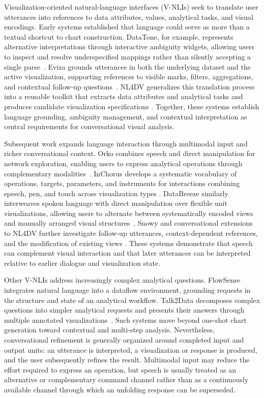 \documentclass[journal]{IEEEtran}
\begin{document}
Visualization-oriented natural-language interfaces (V-NLIs) seek to translate
user utterances into references to data attributes, values, analytical tasks,
and visual encodings. Early systems established that language could serve as
more than a textual shortcut to chart construction. DataTone, for example,
represents alternative interpretations through interactive ambiguity widgets,
allowing users to inspect and resolve underspecified mappings rather than
silently accepting a single parse~\cite{gao2015datatone}. Eviza grounds
utterances in both the underlying dataset and the active visualization,
supporting references to visible marks, filters, aggregations, and contextual
follow-up questions~\cite{setlur2016eviza}. NL4DV generalizes this translation
process into a reusable toolkit that extracts data attributes and analytical
tasks and produces candidate visualization specifications
\cite{narechania2021nl4dv}. Together, these systems establish language
grounding, ambiguity management, and contextual interpretation as central
requirements for conversational visual analysis.

Subsequent work expands language interaction through multimodal input and
richer conversational context. Orko combines speech and direct manipulation
for network exploration, enabling users to express analytical operations
through complementary modalities~\cite{srinivasan2018orko}. InChorus develops
a systematic vocabulary of operations, targets, parameters, and instruments
for interactions combining speech, pen, and touch across visualization types
\cite{srinivasan2020inchorus}. DataBreeze similarly interweaves spoken language
with direct manipulation over flexible unit visualizations, allowing users to
alternate between systematically encoded views and manually arranged visual
structures~\cite{srinivasan2021databreeze}. Snowy and conversational extensions
to NL4DV further investigate follow-up utterances, context-dependent
references, and the modification of existing views
\cite{srinivasan2021snowy,mitra2022conversational}. These systems demonstrate
that speech can complement visual interaction and that later utterances can be
interpreted relative to earlier dialogue and visualization state.

Other V-NLIs address increasingly complex analytical questions. FlowSense
integrates natural language into a dataflow environment, grounding requests in
the structure and state of an analytical workflow. Talk2Data decomposes complex
questions into simpler analytical requests and presents their answers through
multiple annotated visualizations~\cite{guo2021talk2data}. Such systems move
beyond one-shot chart generation toward contextual and multi-step analysis.
Nevertheless, conversational refinement is generally organized around
completed input and output units: an utterance is interpreted, a visualization
or response is produced, and the user subsequently refines the result.
Multimodal input may reduce the effort required to express an operation, but
speech is usually treated as an alternative or complementary command channel
rather than as a continuously available channel through which an unfolding
response can be superseded.
\end{document}
